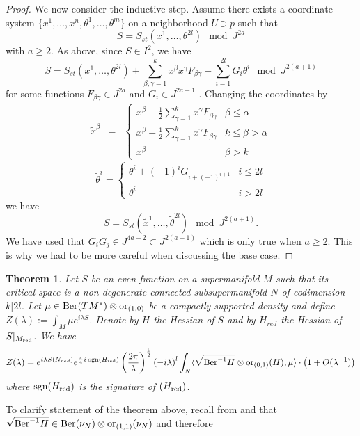 \documentclass[11pt]{amsart}
\numberwithin{equation}{section}
\numberwithin{figure}{section}
\theoremstyle{plain}
\newtheorem{thm}{Theorem}[subsection]
\theoremstyle{definition}
\theoremstyle{remark}
\begin{document}
\begin{proof}
We now consider the inductive step. Assume there exists a coordinate
system $\{x^{1},\dots,x^{n},\theta^{1},\dots,\theta^{m}\}$ on a neighborhood
$U\ni p$ such that 
\[
S=S_{st}(x^{1},\dots,\theta^{2l})\mod J^{2a}
\]
with $a\geq2$. As above, since $S\in I^{2}$, we have
\[
S=S_{st}(x^{1},\dots,\theta^{2l})+\sum_{\beta,\gamma=1}^{k}x^{\beta}x^{\gamma}F_{\beta\gamma}+\sum_{i=1}^{2l}G_{i}\theta^{i}\mod J^{2(a+1)}
\]
for some functions $F_{\beta\gamma}\in J^{2a}$ and $G_{i}\in J^{2a-1}$
. Changing the coordinates by
\begin{eqnarray*}
\tilde{x}^{\beta} & = & \begin{cases}
x^{\beta}+\frac{1}{2}\sum_{\gamma=1}^{k}x^{\gamma}F_{\beta\gamma} & \beta\leq\alpha\\
x^{\beta}-\frac{1}{2}\sum_{\gamma=1}^{k}x^{\gamma}F_{\beta\gamma} & k\leq\beta>\alpha\\
x^{\beta} & \beta>k
\end{cases}
\end{eqnarray*}
\[
\tilde{\theta}^{i}=\begin{cases}
\theta^{i}+(-1)^{i}G_{i+(-1)^{i+1}} & i\leq2l\\
\theta^{i} & i>2l
\end{cases}
\]
we have
\[
S=S_{st}(\tilde{x}^{1},\dots,\tilde{\theta}^{2l})\mod J^{2(a+1)}.
\]
We have used that $G_{i}G_{j}\in J^{4a-2}\subset J^{2(a+1)}$ which
is only true when $a\geq2$. This is why we had to be more careful
when discussing the base case. \end{proof}
\begin{thm}
\label{thm:super_stationary_phase_approx} Let $S$ be an even function
on a supermanifold $M$ such that its critical space is a non-degenerate
connected subsupermanifold $N$ of codimension $k|2l$. Let $\mu\in\mathrm{Ber}(TM^{*})\otimes\mathrm{or}_{(1,0)}$
be a compactly supported density and define $Z(\lambda):=\int_{M}\mu e^{i\lambda S}$.
Denote by $H$ the Hessian of $S$ and by $H_{red}$ the Hessian of
$S|_{M_{\mathrm{red}}}$. We have 
\[
Z(\lambda)=e^{i\lambda S(N_{red})}e^{\frac{\pi}{4}i\cdot\mathrm{sgn}(H_{\mathrm{red}})}\left(\frac{2\pi}{\lambda}\right)^{\frac{k}{2}}\left(-i\lambda\right)^{l}\int_{N}\langle\sqrt{\mathrm{Ber}^{-1}H}\otimes\mathrm{or}_{(0,1)}(H),\mu\rangle\cdot\left(1+O(\lambda^{-1})\right)
\]
where $\mathrm{sgn}(H_{\mathrm{red}})$ is the signature of $(H_{\mathrm{red}})$. 
\end{thm}
To clarify statement of the theorem above, recall from 
and  that $\sqrt{\mathrm{Ber}^{-1}H}\in\mathrm{Ber}(\nu_{N})\otimes\mathrm{or}_{(1,1)}(\nu_{N})$
and therefore %
\end{document}
